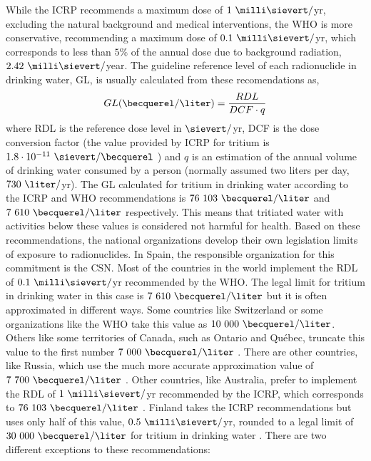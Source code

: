 While the ICRP recommends a maximum dose of $1~\milli\sievert/$yr, excluding the natural background and medical interventions, the WHO is more conservative, recommending a maximum dose of $0.1~\milli\sievert/$yr, which corresponds to less than $5\%$ of the annual dose due to background radiation, $2.42~\milli\sievert/$year. The guideline reference level of each radionuclide in drinking water, GL, is usually calculated from these recomendations as,
\begin{equation}
GL (\becquerel/\liter) = \frac{RDL}{DCF \cdot{} q}
\label{eq:Guideline}
\end{equation}
where RDL is the reference dose level in $\sievert/$yr, DCF is the dose conversion factor (the value provided by ICRP for tritium is $1.8 \cdot{} 10^{-11}~\sievert/ \becquerel$ \cite{ICRP_factor}) and $q$ is an estimation of the annual volume of drinking water consumed by a person (normally assumed two liters per day, $730~\liter/$yr). The GL calculated for tritium in drinking water according to the ICRP and WHO recommendations is $76~103~\becquerel/\liter$ and $7~610~\becquerel/\liter$  respectively. This means that tritiated water with activities below these values is considered not harmful for health. Based on these recommendations, the national organizations develop their own legislation limits of exposure to radionuclides. In Spain, the responsible organization for this commitment is the CSN. Most of the countries in the world implement the RDL of $0.1~\milli\sievert/$yr recommended by the WHO. The legal limit for tritium in drinking water in this case is $7~610~\becquerel/\liter$  but it is often approximated in different ways. Some countries like Switzerland \cite{Switzerland_GL} or some organizations like the WHO \cite{WHO_GL} take this value as $10~000~\becquerel/\liter$. Others like some territories of Canada, such as Ontario and Québec, truncate this value to the first number $7~000~\becquerel/\liter$ \cite{Ontario_GL, Quebec_GL}. There are other countries, like Russia, which use the much more accurate approximation value of $7~700~\becquerel/\liter$ \cite{Russia_GL}. Other countries, like Australia, prefer to implement the RDL of $1~\milli\sievert/$yr recommended by the ICRP, which corresponds to $76~103~\becquerel/\liter$ \cite{Australia_GL}. Finland takes the ICRP recommendations but uses only half of this value, $0.5~\milli\sievert/$yr, rounded to a legal limit of $30~000~\becquerel/\liter$ for tritium in drinking water \cite{Finland_GL}. There are two different exceptions to these recommendations:
